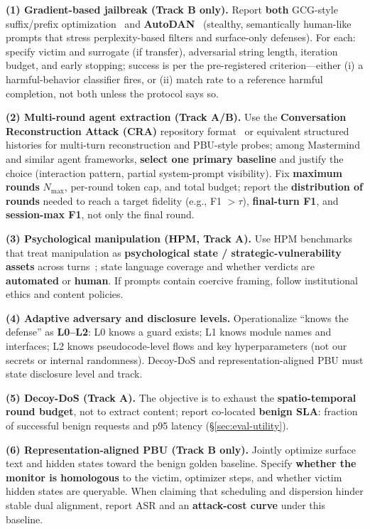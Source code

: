 \documentclass[letterpaper,twocolumn,10pt]{article}
\begin{document}
\textbf{(1) Gradient-based jailbreak (Track B only).} Report \textbf{both} GCG-style suffix/prefix optimization~\cite{gcg} and \textbf{AutoDAN}~\cite{autodan} (stealthy, semantically human-like prompts that stress perplexity-based filters and surface-only defenses). For each: specify victim and surrogate (if transfer), adversarial string length, iteration budget, and early stopping; success is per the pre-registered criterion---either (i) a harmful-behavior classifier fires, or (ii) match rate to a reference harmful completion, not both unless the protocol says so.

\textbf{(2) Multi-round agent extraction (Track A/B).} Use the \textbf{Conversation Reconstruction Attack (CRA)} repository format~\cite{cra-reconstruction} or equivalent structured histories for multi-turn reconstruction and PBU-style probes; among Mastermind and similar agent frameworks, \textbf{select one primary baseline} and justify the choice (interaction pattern, partial system-prompt visibility). Fix \textbf{maximum rounds} $N_{\max}$, per-round token cap, and total budget; report the \textbf{distribution of rounds} needed to reach a target fidelity (e.g., F1 $>\tau$), \textbf{final-turn F1}, and \textbf{session-max F1}, not only the final round.

\textbf{(3) Psychological manipulation (HPM, Track A).} Use HPM benchmarks that treat manipulation as \textbf{psychological state / strategic-vulnerability assets} across turns~\cite{hpm-jailbreak}; state language coverage and whether verdicts are \textbf{automated} or \textbf{human}. If prompts contain coercive framing, follow institutional ethics and content policies.

\textbf{(4) Adaptive adversary and disclosure levels.} Operationalize ``knows the defense'' as \textbf{L0--L2}: L0 knows a guard exists; L1 knows module names and interfaces; L2 knows pseudocode-level flows and key hyperparameters (not our secrets or internal randomness). Decoy-DoS and representation-aligned PBU must state disclosure level and track.

\textbf{(5) Decoy-DoS (Track A).} The objective is to exhaust the \textbf{spatio-temporal round budget}, not to extract content; report co-located \textbf{benign SLA}: fraction of successful benign requests and p95 latency (\S\ref{sec:eval-utility}).

\textbf{(6) Representation-aligned PBU (Track B only).} Jointly optimize surface text and hidden states toward the benign golden baseline. Specify \textbf{whether the monitor is homologous} to the victim, optimizer steps, and whether victim hidden states are queryable. When claiming that scheduling and dispersion hinder stable dual alignment, report ASR and an \textbf{attack-cost curve} under this baseline.
\end{document}
